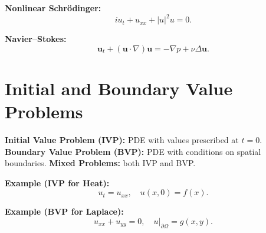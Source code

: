 \documentclass[12pt]{book}
\begin{document}
\textbf{Nonlinear Schr\"odinger:}
\[
i u_t + u_{xx} + |u|^2 u = 0.
\]

\textbf{Navier--Stokes:}
\[
\mathbf{u}_t + (\mathbf{u}\cdot\nabla)\mathbf{u} = -\nabla p + \nu \Delta \mathbf{u}.
\]

\chapter{Initial and Boundary Value Problems}
\textbf{Initial Value Problem (IVP):} PDE with values prescribed at $t=0$.  
\textbf{Boundary Value Problem (BVP):} PDE with conditions on spatial boundaries.  
\textbf{Mixed Problems:} both IVP and BVP.

\textbf{Example (IVP for Heat):}
\[
u_t = u_{xx}, \quad u(x,0) = f(x).
\]

\textbf{Example (BVP for Laplace):}
\[
u_{xx} + u_{yy} = 0, \quad u|_{\partial \Omega} = g(x,y).
\]
\end{document}

